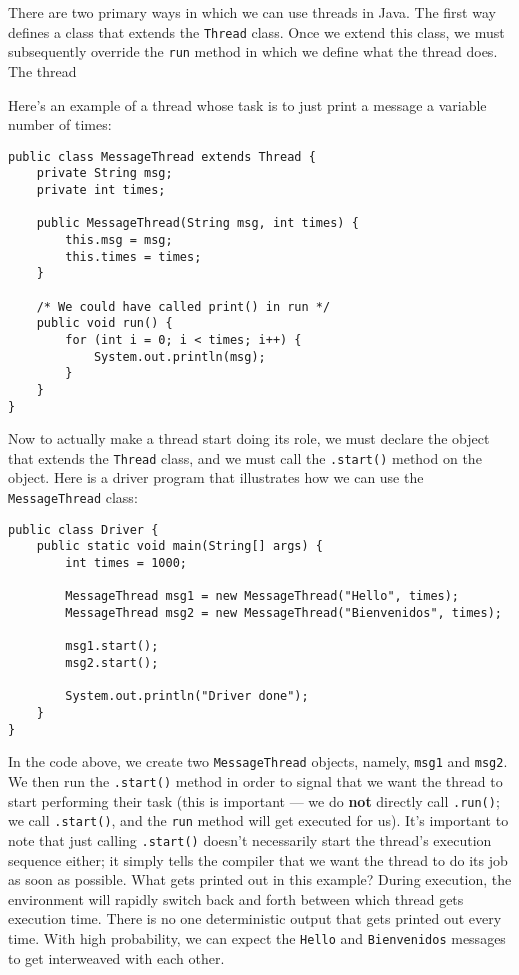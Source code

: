 There are two primary ways in which we can use threads in Java. The first way defines a class that extends the \verb!Thread! class. Once we extend this class, we must subsequently override the \verb!run! method in which we define what the thread does. The thread 

Here's an example of a thread whose task is to just print a message a variable number of times:

\begin{lstlisting}
public class MessageThread extends Thread {
	private String msg;
	private int times;

	public MessageThread(String msg, int times) {
		this.msg = msg;
		this.times = times;
	}

	/* We could have called print() in run */
	public void run() {
		for (int i = 0; i < times; i++) {
			System.out.println(msg);
		}
	}
}
\end{lstlisting}

Now to actually make a thread start doing its role, we must declare the object that extends the \verb!Thread! class, and we must call the \verb!.start()! method on the object. Here is a driver program that illustrates how we can use the \verb!MessageThread! class:

\begin{lstlisting}
public class Driver {
	public static void main(String[] args) {
		int times = 1000;

		MessageThread msg1 = new MessageThread("Hello", times);
		MessageThread msg2 = new MessageThread("Bienvenidos", times);

		msg1.start();
		msg2.start();

		System.out.println("Driver done");
	}
}
\end{lstlisting}

In the code above, we create two \verb!MessageThread! objects, namely, \verb!msg1! and \verb!msg2!. We then run the \verb!.start()! method in order to signal that we want the thread to start performing their task (this is important --- we do \textbf{not} directly call \verb!.run()!; we call \verb!.start()!, and the \verb!run! method will get executed for us). It's important to note that just calling \verb!.start()! doesn't necessarily start the thread's execution sequence either; it simply tells the compiler that we want the thread to do its job as soon as possible. What gets printed out in this example? During execution, the environment will rapidly switch back and forth between which thread gets execution time. There is no one deterministic output that gets printed out every time. With high probability, we can expect the \verb!Hello! and \verb!Bienvenidos! messages to get interweaved with each other.


